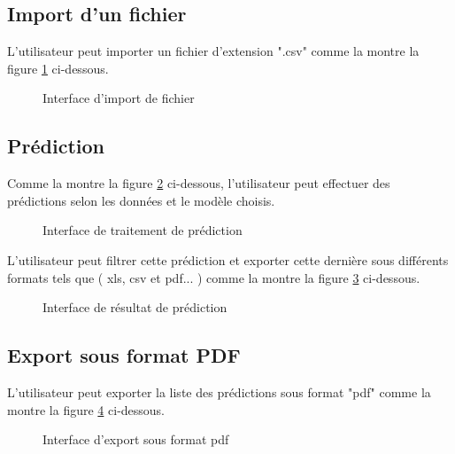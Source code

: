         \subsection{Import d'un fichier}
        L'utilisateur peut importer un fichier d'extension ".csv" comme la montre la figure \ref{fig:InterfaceImport} ci-dessous.
       \begin{figure}[htpb]
    \centering
    \caption{Interface d'import de fichier}
    \label{fig:InterfaceImport}
    \end{figure}
    \newpage
\subsection{Prédiction}
Comme la montre la figure \ref{fig:Interface de traitement de prédiction} ci-dessous, l’utilisateur peut effectuer des prédictions selon les données et le modèle choisis. 
    \begin{figure}[htpb]
    \centering
    \caption{Interface de traitement de prédiction}
    \label{fig:Interface de traitement de prédiction}
    \end{figure}
    \newpage
L’utilisateur peut filtrer cette prédiction et exporter cette dernière sous différents formats tels que ( xls, csv et pdf... ) comme la montre la figure     \ref{fig:Interface de résultat de prédiction} ci-dessous.
    \begin{figure}[htpb]
    \centering
    \caption{Interface de résultat de prédiction}
    \label{fig:Interface de résultat de prédiction}
    \end{figure}   
    \newpage
\subsection{Export sous format PDF}
L’utilisateur peut exporter la liste des prédictions sous format "pdf" comme la montre la figure \ref{fig:Interfaceexport} ci-dessous.
 \begin{figure}[htpb]
    \centering
    \caption{Interface d'export sous format pdf}
    \label{fig:Interfaceexport}
    \end{figure}   
    \newpage
    
